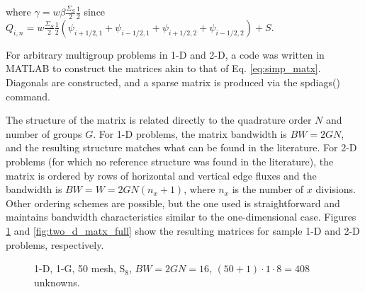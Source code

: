 \documentclass[final,3p,times,11pt]{elsarticle}
\begin{document}
    where  $\gamma = w \beta \frac{\Sigma_S}{2}\frac{1}{2}$ since $Q_{i,n} = w \frac{\Sigma_S}{2}\frac{1}{2}(\psi_{i+1/2,1}+\psi_{i-1/2,1}+\psi_{i+1/2,2}+\psi_{i-1/2,2})+S$.

    For arbitrary multigroup problems in 1-D and 2-D, a code was written in MATLAB to construct the matrices akin to that of Eq. \ref{eq:simp_matx}.  Diagonals are constructed, and a sparse matrix is produced via the {\sf spdiags()} command. 

    The structure of the matrix is related directly to the quadrature order $N$ and number of groups $G$.  For 1-D problems, the matrix bandwidth is $BW=2GN$, and the resulting structure matches what can be found in the literature\cite{patton2002apg}. For 2-D problems (for which no reference structure was found in the literature), the matrix is ordered by rows of horizontal and vertical edge fluxes and the bandwidth is $BW=W=2GN(n_x+1)$, where $n_x$ is the number of $x$ divisions.  Other ordering schemes are possible, but the one used is straightforward and maintains bandwidth characteristics similar to the one-dimensional case.  Figures \ref{fig:lalala} and \ref{fig:two_d_matx_full} show the resulting matrices for sample 1-D and 2-D problems, respectively.


    \begin{figure}[ht]
      \centering
      \caption{1-D, 1-G, 50 mesh, S$_8$, $BW=2GN=16$, $(50+1)\cdot1\cdot 8=408$ unknowns.}
      \label{fig:lalala}
    \end{figure}
\end{document}
